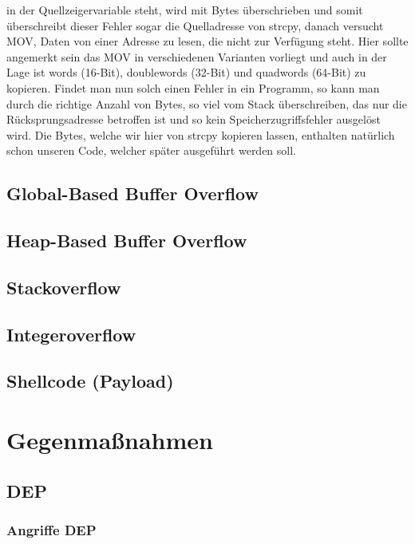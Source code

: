 ﻿\documentclass[12pt]{book}
\begin{document}
in der Quellzeigervariable steht, wird mit Bytes überschrieben und somit
überschreibt dieser Fehler sogar die Quelladresse von strcpy, danach versucht
MOV, Daten von einer Adresse zu lesen, die nicht zur Verfügung steht. Hier sollte
angemerkt sein das MOV in verschiedenen Varianten vorliegt und auch in der Lage
ist words (16-Bit), doublewords (32-Bit) und quadwords (64-Bit) zu kopieren.
Findet man nun solch einen Fehler in ein Programm, so kann man durch die
richtige Anzahl von Bytes, so viel vom Stack überschreiben, das nur die
Rücksprungsadresse betroffen ist und so kein Speicherzugriffsfehler ausgelöst
wird. Die Bytes, welche wir hier von strcpy kopieren lassen, enthalten natürlich
schon unseren Code, welcher später ausgeführt werden soll.

\subsection{Global-Based Buffer Overflow}

\subsection{Heap-Based Buffer Overflow}

\subsection{Stackoverflow}

\subsection{Integeroverflow}

\subsection{Shellcode (Payload)}

\section{Gegenmaßnahmen}

\subsection{DEP}

\subsubsection{Angriffe DEP}
\end{document}
